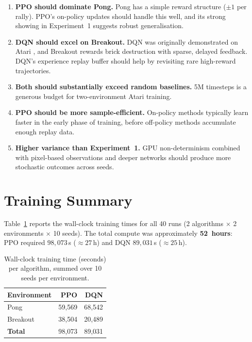 \begin{enumerate}
  \item \textbf{PPO should dominate Pong.}
        Pong has a simple reward structure ($\pm 1$ per rally). PPO's
        on-policy updates should handle this well, and its strong
        showing in Experiment~1 suggests robust generalisation.

  \item \textbf{DQN should excel on Breakout.}
        DQN was originally demonstrated on Atari
        \citep{mnih2015human}, and Breakout rewards brick destruction
        with sparse, delayed feedback. DQN's experience replay buffer
        should help by revisiting rare high-reward trajectories.

  \item \textbf{Both should substantially exceed random baselines.}
        5M timesteps is a generous budget for two-environment Atari
        training.

  \item \textbf{PPO should be more sample-efficient.}
        On-policy methods typically learn faster in the early phase of
        training, before off-policy methods accumulate enough replay
        data.

  \item \textbf{Higher variance than Experiment~1.}
        GPU non-determinism combined with pixel-based observations and
        deeper networks should produce more stochastic outcomes across
        seeds.
\end{enumerate}

\section{Training Summary}
\label{sec:atari-training}

Table~\ref{tab:atari-training-time} reports the wall-clock training
times for all 40 runs (2 algorithms $\times$ 2 environments $\times$
10 seeds). The total compute was approximately
\textbf{52~hours}: PPO required $98{,}073$\,s (${\approx}27$\,h)
and DQN $89{,}031$\,s (${\approx}25$\,h).

\begin{table}[htbp!]
\centering
\caption{Wall-clock training time (seconds) per algorithm, summed over
         10 seeds per environment.}
\label{tab:atari-training-time}
\begin{tabular}{lrr}
\toprule
\textbf{Environment} & \textbf{PPO} & \textbf{DQN} \\
\midrule
Pong      & 59{,}569 & 68{,}542 \\
Breakout  & 38{,}504 & 20{,}489 \\
\midrule
\textbf{Total} & 98{,}073 & 89{,}031 \\
\bottomrule
\end{tabular}
\end{table}

